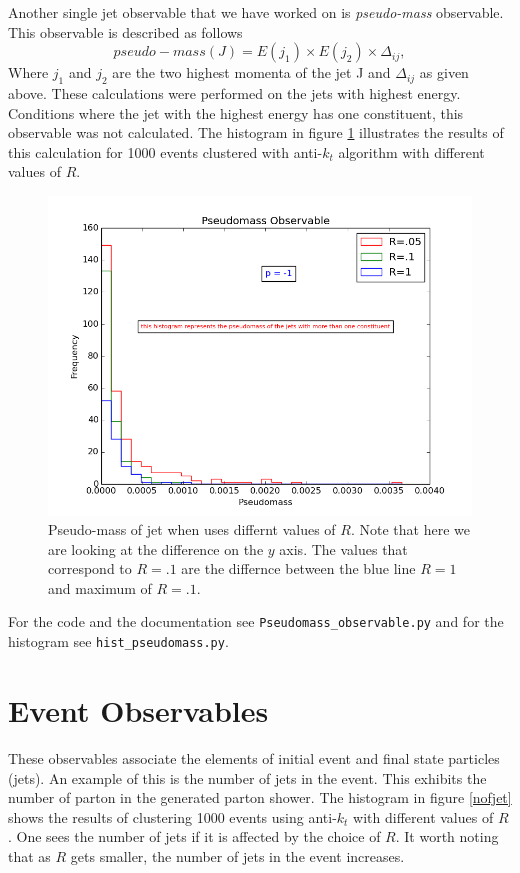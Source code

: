 Another single jet observable that we have worked on is \textit{pseudo-mass} observable. This observable is described as follows \begin{equation}
pseudo-mass(J) = E(j_1) \times E(j_2) \times \Delta_{ij} ,
\end{equation}   Where $j_1$ and $j_2$ are the two highest  momenta of the jet J and $\Delta_{ij}$ as given above. These calculations were performed on the jets with highest energy. Conditions where the jet with the highest energy has one constituent, this observable was not calculated.
The histogram in figure \ref{pseudomass} illustrates the results of this calculation for 1000 events clustered with anti-$k_t$ algorithm with different values of $R$.
\begin{figure}[hbtp]
 \centering
 \includegraphics[scale=.6]{images/Pseudomass_obs.png}
 \caption{Pseudo-mass of jet when uses differnt values of $R$.  Note that here we are looking at the difference on the $y$ axis. The values that correspond to $R = .1$ are the differnce between the blue line $R = 1$ and maximum of $R = .1$.}\label{pseudomass}
 \end{figure}
  
For the code and the documentation see \verb+Pseudomass_observable.py+ and for the histogram see \verb+hist_pseudomass.py+.     


\section{Event Observables} 

These observables associate the elements of initial event and final state particles (jets). An example of this is the number of jets in the event. This exhibits the number of parton in the generated parton shower. The histogram in figure \ref{nofjet} shows the results of clustering 1000 events using anti-$k_t$ with different values of $R$. One sees the number of jets if it is affected by the choice of $R$. It worth noting that as $R$ gets smaller, the number of jets in the event increases. 

